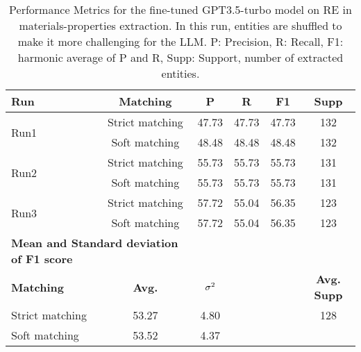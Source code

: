 \begin{table}[htbp]
    \small
    \centering
    \caption{Performance Metrics for the fine-tuned GPT3.5-turbo model on RE in materials-properties extraction. In this run, entities are shuffled to make it more challenging for the LLM. P: Precision, R: Recall, F1: harmonic average of P and R, Supp: Support, number of extracted entities.}
    \begin{tabular}{lccccc}
        \toprule
        \textbf{Run} & \textbf{Matching} & \textbf{P} & \textbf{R} & \textbf{F1} & \textbf{Supp} \\
        \midrule
        \multirow{2}{*}{Run1} & Strict matching & 47.73 & 47.73 & 47.73 & 132 \\
        & Soft matching & 48.48 & 48.48 & 48.48 & 132 \\
        \midrule
        \multirow{2}{*}{Run2} & Strict matching & 55.73 & 55.73 & 55.73 & 131 \\
        & Soft matching & 55.73 & 55.73 & 55.73 & 131 \\
        \midrule
        \multirow{2}{*}{Run3} & Strict matching & 57.72 & 55.04 & 56.35 & 123 \\
        & Soft matching & 57.72 & 55.04 & 56.35 & 123 \\
        \midrule
        \multicolumn{2}{l}{\textbf{Mean and Standard deviation of F1 score}} & & & & \\
        \midrule
        \textbf{Matching} & \textbf{Avg.} & $\sigma\textsuperscript{2}$ & & & \textbf{Avg. Supp}\\
        Strict matching & 53.27 & 4.80 & & & 128 \\
        Soft matching & 53.52 & 4.37 & & \\
        \bottomrule
    \end{tabular}
\end{table}

